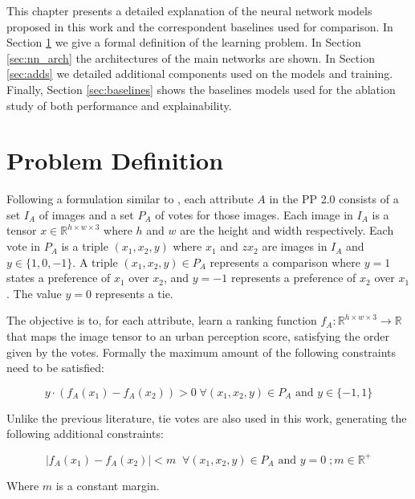 This chapter presents a detailed explanation of the neural network models proposed in this work and
the correspondent baselines used for comparison. In Section \ref{sec:problem_def} we give a formal definition
of the learning problem. In Section \ref{sec:nn_arch} the architectures of
the main networks are shown. In Section \ref{sec:adds} we detailed additional components used on the models and training.
Finally, Section \ref{sec:baselines} shows the baselines models
used for the ablation study of both performance and explainability.


\section{Problem Definition}
\label{sec:problem_def}

Following a formulation similar to , each attribute $A$ in the PP 2.0
consists of a set $I_A$ of images and a set $P_A$ of votes for those images.
Each image in $I_A$ is a tensor $x \in \mathbb{R}^{h \times w \times 3}$ where $h$ and $w$ are the height and width respectively.
Each vote in $P_A$ is a triple $(x_1,x_2,y)$ where $x_1$ and $zx_2$ are images in $I_A$ and $y\in \{1,0,-1\}$.
A triple $(x_1,x_2,y)\in P_A$ represents a comparison where $y=1$ states a preference of $x_1$ over $x_2$, and $y=-1$
represents a preference of $x_2$ over $x_1$. The value $y=0$ represents a tie.

The objective is to, for each attribute, learn a ranking function $f_A : \mathbb{R}^{h \times w \times 3} \rightarrow \mathbb{R}$
that maps the image tensor to an urban perception score, satisfying the order given by the votes. Formally the
maximum amount of the following constraints need to be satisfied:

\begin{equation}
	y \cdot (f_A(x_1) - f_A(x_2)) > 0 \;  \forall (x_1,x_2,y) \in P_A\text{ and }y\in\{-1,1\}
	\label{eq:constraints}
\end{equation}

Unlike the previous literature, tie votes are also used in this work, generating the following additional constraints:

\begin{equation}
	|f_A(x_1) - f_A(x_2)| < m \;\; \forall (x_1,x_2,y) \in P_A\text{ and }y=0 \; ;  m \in \mathbb{R}^+
	\label{eq:constraints_ties}
\end{equation}

Where $m$ is a constant margin.

